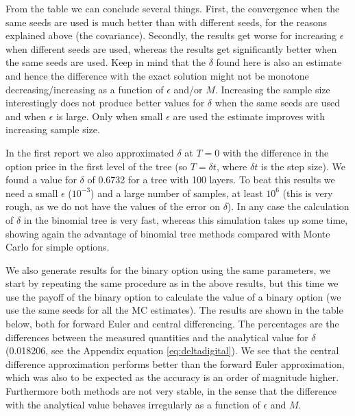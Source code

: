 \documentclass[11pt,a4paper]{article}
\begin{document}
From the table we can conclude several things. First, the convergence when the same seeds are used is much better than with different seeds, for the reasons explained above (the covariance). Secondly, the results get worse for increasing $\epsilon$ when different seeds are used, whereas the results get significantly better when the same seeds are used. Keep in mind that the $\delta$ found here is also an estimate and hence the difference with the exact solution might not be monotone decreasing/increasing as a function of $\epsilon$ and/or $M$. Increasing the sample size interestingly does not produce better values for $\delta$ when the same seeds are used and when $\epsilon$ is large. Only when small $\epsilon$ are used the estimate improves with increasing sample size.

In the first report we also approximated $\delta$ at $T = 0$ with the difference in the option price in the first level of the tree (so $T = \delta t$, where $\delta t$ is the step size). We found a value for $\delta$ of 0.6732 for a tree with 100 layers. To beat this results we need a small $\epsilon$ ($10^{-3}$) and a large number of samples, at least $10^6$ (this is very rough, as we do not have the values of the error on $\delta$). In any case the calculation of $\delta$ in the binomial tree is very fast, whereas this simulation takes up some time, showing again the advantage of binomial tree methods compared with Monte Carlo for simple options.

We also generate results for the binary option using the same parameters, we start by repeating the same procedure as in the above results, but this time we use the payoff of the binary option to calculate the value of a binary option (we use the same seeds for all the MC estimates). The results are shown in the table below, both for forward Euler and central differencing. The percentages are the differences between the measured quantities and the analytical value for $\delta$ (0.018206, see the Appendix equation \ref{eq:deltadigital}). We see that the central difference approximation performs better than the forward Euler approximation, which was also to be expected as the accuracy is an order of magnitude higher. Furthermore both methods are not very stable, in the sense that the difference with the analytical value behaves irregularly as a function of $\epsilon$ and $M$. 
\end{document}
